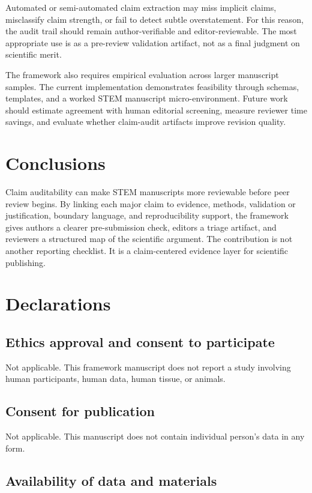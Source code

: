 \documentclass[12pt]{article}
\begin{document}
Automated or semi-automated claim extraction may miss implicit claims, misclassify claim strength, or fail to detect subtle overstatement. For this reason, the audit trail should remain author-verifiable and editor-reviewable. The most appropriate use is as a pre-review validation artifact, not as a final judgment on scientific merit.

The framework also requires empirical evaluation across larger manuscript samples. The current implementation demonstrates feasibility through schemas, templates, and a worked STEM manuscript micro-environment. Future work should estimate agreement with human editorial screening, measure reviewer time savings, and evaluate whether claim-audit artifacts improve revision quality.

\section{Conclusions}

Claim auditability can make STEM manuscripts more reviewable before peer review begins. By linking each major claim to evidence, methods, validation or justification, boundary language, and reproducibility support, the framework gives authors a clearer pre-submission check, editors a triage artifact, and reviewers a structured map of the scientific argument. The contribution is not another reporting checklist. It is a claim-centered evidence layer for scientific publishing.

\section*{Declarations}

\subsection*{Ethics approval and consent to participate}

Not applicable. This framework manuscript does not report a study involving human participants, human data, human tissue, or animals.

\subsection*{Consent for publication}

Not applicable. This manuscript does not contain individual person's data in any form.

\subsection*{Availability of data and materials}
\end{document}

